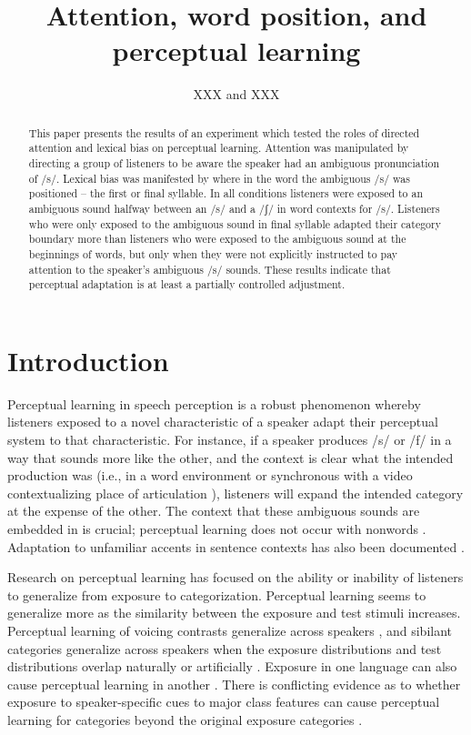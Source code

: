 \documentclass[a4paper,11pt,twocolumn]{article}
\title{Attention, word position, and perceptual learning}
\author{XXX and XXX}
\begin{document}
\maketitle

\begin{abstract}
This paper presents the results of an experiment which tested the roles of directed attention and lexical bias on perceptual learning. Attention was manipulated by directing a group of listeners to be aware the speaker had an ambiguous pronunciation of /s/. Lexical bias was manifested by where in the word the ambiguous /s/ was positioned -- the first or final syllable. In all conditions listeners were exposed to an ambiguous sound halfway between an /s/ and a /ʃ/ in word contexts for /s/.  Listeners who were only exposed to the ambiguous sound in final syllable adapted their category boundary more than listeners who were exposed to the ambiguous sound at the beginnings of words, but only when they were not explicitly instructed to pay attention to the speaker's ambiguous /s/ sounds. These results indicate that perceptual adaptation is at least a partially controlled adjustment. 
\end{abstract}



\section{Introduction}

Perceptual learning in speech perception is a robust phenomenon whereby listeners exposed to a novel characteristic of a speaker adapt their perceptual system to that characteristic. For instance, if a speaker produces /s/ or /f/ in a way that sounds more like the other, and the context is clear what the intended production was (i.e., in a word environment \cite{Norris2003} or synchronous with a video contextualizing place of articulation \cite{Bertelson2003}), listeners will expand the intended category at the expense of the other.  The context that these ambiguous sounds are embedded in is crucial; perceptual learning does not occur with nonwords \cite{Norris2003}. Adaptation to unfamiliar accents in sentence contexts has also been documented \cite{Bradlow2008}.

Research on perceptual learning has focused on the ability or inability of listeners to generalize from exposure to categorization.  Perceptual learning seems to generalize more as the similarity between the exposure and test stimuli increases. Perceptual learning of voicing contrasts generalize across speakers \cite{Kraljic2007}, and sibilant categories generalize across speakers when the exposure distributions and test distributions overlap naturally \cite{Kraljic2005} or artificially \cite{Eisner2006}. Exposure in one language can also cause perceptual learning in another \cite{Reinisch2013}.  There is conflicting evidence as to whether exposure to speaker-specific cues to major class features can cause perceptual learning for categories beyond the original exposure categories \cite{Kraljic2006,Reinisch2014}.  
\end{document}
